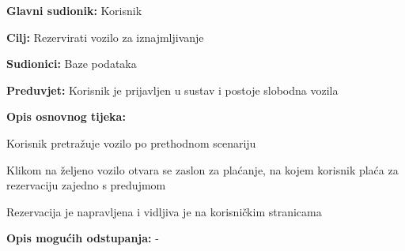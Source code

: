 					\noindent {}
					\begin{packed_item}
	
						\item \textbf{Glavni sudionik: }Korisnik
						\item  \textbf{Cilj: }Rezervirati vozilo za iznajmljivanje
						\item  \textbf{Sudionici: }Baze podataka
						\item  \textbf{Preduvjet: }Korisnik je prijavljen u sustav i postoje slobodna vozila
						\item  \textbf{Opis osnovnog tijeka:}
						
						\item[] \begin{packed_enum}
							\item Korisnik pretražuje vozilo po prethodnom scenariju
							\item Klikom na željeno vozilo otvara se zaslon za plaćanje, na kojem korisnik plaća za rezervaciju zajedno s predujmom
							\item Rezervacija je napravljena i vidljiva je na korisničkim stranicama
						\end{packed_enum}
						
						\item  \textbf{Opis mogućih odstupanja: }-
					\end{packed_item}
					
